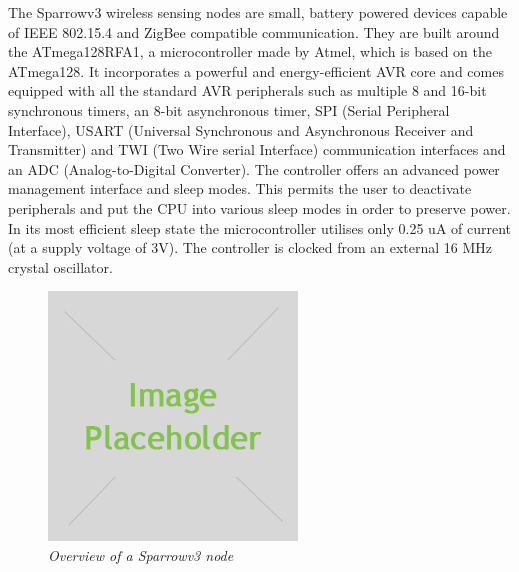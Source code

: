 The Sparrowv3 wireless sensing nodes are small, battery powered devices capable
of IEEE 802.15.4 and ZigBee compatible communication. They are built around the
\mbox{ATmega128RFA1}, a microcontroller made by Atmel, which is based on the
\mbox{ATmega128}. It incorporates a powerful and energy-efficient AVR core and
comes equipped with all the standard AVR peripherals such as multiple 8 and
16-bit synchronous timers, an 8-bit asynchronous timer, SPI (Serial Peripheral
Interface), USART (Universal Synchronous and Asynchronous Receiver and
Transmitter) and TWI (Two Wire serial Interface) communication interfaces and
an ADC (Analog-to-Digital Converter). The controller offers an advanced power
management interface and sleep modes. This permits the user to deactivate
peripherals and put the CPU into various sleep modes in order to preserve
power. In its most efficient sleep state the microcontroller utilises only 0.25
uA of current (at a supply voltage of 3V). The controller is clocked from an
external 16 MHz crystal oscillator.

\begin{figure}[ht]
	\begin{center}
		\includegraphics[width=\textwidth]{img/placeholder.jpg}
	\end{center}
	\caption{\small \itshape{Overview of a Sparrowv3 node}}
\end{figure}

